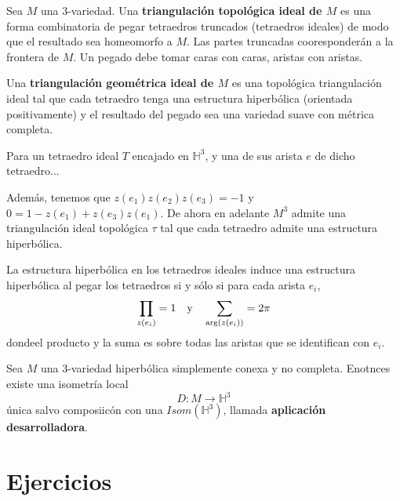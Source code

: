 \documentclass[12pt]{report}
\theoremstyle{largebreak}
\newcommand\cf[3]{\ensuremath{#1:#2\rightarrow#3}}
\begin{document}
    \begin{mydef}
        Sea $M$ una 3-variedad. Una \textbf{triangulación topológica ideal de $M$} es una forma combinatoria de pegar tetraedros truncados (tetraedros ideales) de modo que el resultado sea homeomorfo a $M$. Las partes truncadas cooresponderán a la frontera de $M$. Un pegado debe tomar caras con caras, aristas con aristas.

        Una \textbf{triangulación geométrica ideal de $M$} es una topológica triangulación ideal tal que cada tetraedro tenga una estructura hiperbólica (orientada positivamente) y el resultado del pegado sea una variedad suave con métrica completa.
    \end{mydef}

    Para un tetraedro ideal $T$ encajado en $\mathbb{H}^3$, y una de sus arista $e$ de dicho tetraedro...

    Además, tenemos que $z(e_1)z(e_2)z(e_3)=-1$ y $0=1-z(e_1)+z(e_3)z(e_1)$. De ahora en adelante $M^3$ admite una triangulación ideal topológica $\tau$ tal que cada tetraedro admite una estructura hiperbólica.

    \begin{theor}
        La estructura hiperbólica en los tetraedros ideales induce una estructura hiperbólica al pegar los tetraedros si y sólo si para cada arista $e_i$,
        \begin{equation*}
            \prod_{ z(e_i)}=1\quad\textup{y}\quad\sum_{ \arg(z(e_i))}=2\pi
        \end{equation*}
        dondeel producto y la suma es sobre todas las aristas que se identifican con $e_i$.
    \end{theor}

    \begin{propo}
        Sea $M$ una 3-variedad hiperbólica simplemente conexa y no completa. Enotnces existe una isometría local
        \begin{equation*}
            \cf{D}{M}{\mathbb{H}^3}
        \end{equation*}
        única salvo composiicón con una $Isom(\mathbb{H}^3)$, llamada \textbf{aplicación desarrolladora}.
    \end{propo}

    \begin{propo}[Nombre]
        
    \end{propo}

    \chapter{Ejercicios}
\end{document}
